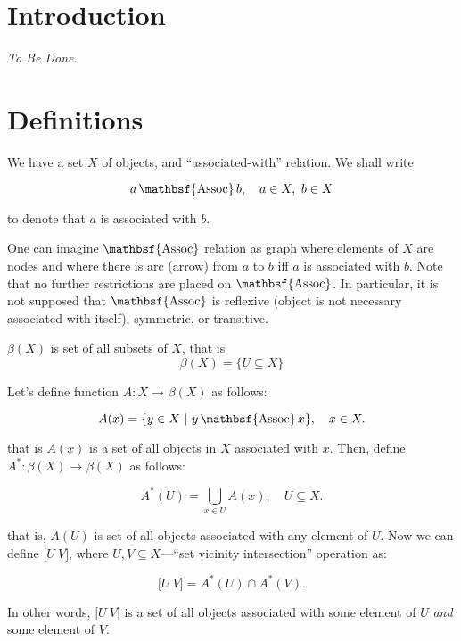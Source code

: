 \documentclass[a4paper, oneside, fleqn]{article}
\makeatletter
\def\qopname@#1{\mathop{\fam 0#1}\nolimits}
\newcommand{\mathsign}[1]
	{\index{#1@$\mathbsf{#1}$}\qopname@{\mathbsf{#1}}}
\def\As{\mathsign{Assoc}}
\newcommand{\svi}[2]
    {\texttt{[} #1 \ V \texttt{]}}
\makeatother
\begin{document}
\section{Introduction}

\emph{To Be Done.}

\section{Definitions}

We have a set $X$ of objects, and ``associated-with'' relation. We shall write

$$a\As b, \quad a\in X, \ b\in X$$

to denote that $a$ is associated with $b$.

One can imagine $\As$ relation as graph where elements of $X$ are nodes and
where there is arc (arrow) from $a$ to $b$ iff $a$ is associated with
$b$. Note that no further restrictions are placed on $\As$. In particular, it
is not supposed that $\As$ is reflexive (object is not necessary associated
with itself), symmetric, or transitive.

$\beta(X)$ is set of all subsets of $X$, that is $$\beta(X) = \{ U \subseteq X
\}$$

Let's define function $A:X\to^{}\beta(X)$ as follows:

$$A(x)=\{y\in X\ |\ y\As x\}, \quad x\in X.$$

that is $A(x)$ is a set of all objects in $X$ associated with $x$.
Then, define \mbox{$A^*:\beta(X)\to^{}\beta(X)$} as follows:

$$A^*(U)=\bigcup\limits_{x\in U} A(x), \quad U\subseteq X.$$

that is, $A(U)$ is set of all objects associated with any element of $U$. Now
we can define $\svi{U}{V}$, where $U, V\subseteq X$---``set vicinity
intersection'' operation as:


$$\svi{U}{V} = A^*(U) \cap A^*(V).$$

In other words, $\svi{U}{V}$ is a set of all objects associated with some
element of $U$ \emph{and} some element of $V$.
\end{document}
